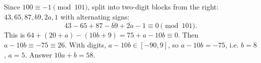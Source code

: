 Since $100\equiv-1\pmod{101}$, split into two-digit blocks from the right: $43,65,87,b9,2a,1$ with alternating signs:
\[43-65+87-\overline{b9}+\overline{2a}-1\equiv0\pmod{101}.\]
This is $64+(20+a)-(10b+9)=75+a-10b\equiv0$. Then $a-10b\equiv-75\equiv26$. With digits, $a-10b\in[-90,9]$, so $a-10b=-75$, i.e. $b=8$, $a=5$. Answer $10a+b=\boxed{58}$.
